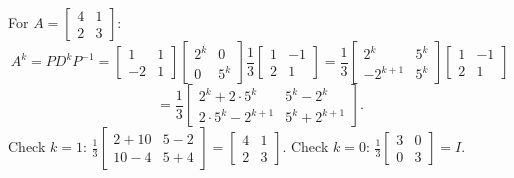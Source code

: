 \begin{example}
For $A=\begin{bmatrix}4&1\\2&3\end{bmatrix}$:
\[
A^k=PD^kP^{-1}=\begin{bmatrix}1&1\\-2&1\end{bmatrix}\begin{bmatrix}2^k&0\\0&5^k\end{bmatrix}\frac13\begin{bmatrix}1&-1\\2&1\end{bmatrix}
=\frac13\begin{bmatrix}2^k&5^k\\-2^{k+1}&5^k\end{bmatrix}\begin{bmatrix}1&-1\\2&1\end{bmatrix}
\]
\[
=\frac13\begin{bmatrix}2^k+2\cdot5^k & 5^k-2^k\\ 2\cdot5^k-2^{k+1} & 5^k+2^{k+1}\end{bmatrix}.
\]
Check $k=1$: $\frac13\begin{bmatrix}2+10&5-2\\10-4&5+4\end{bmatrix}=\begin{bmatrix}4&1\\2&3\end{bmatrix}$. Check $k=0$:
$\frac13\begin{bmatrix}3&0\\0&3\end{bmatrix}=I$.
\end{example}


